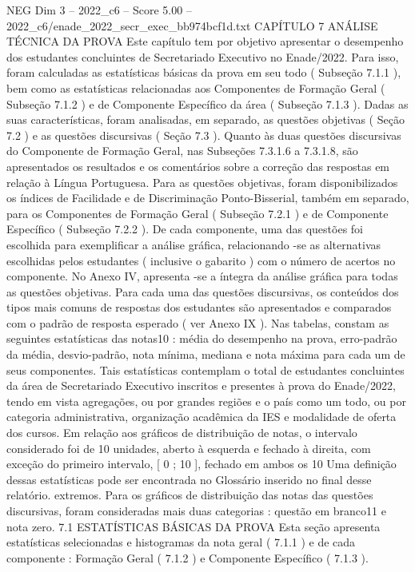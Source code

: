 \begin{textsample}{NEG Dim 3 – 2022\_c6 – Score 5.00 – 2022\_c6/enade\_2022\_secr\_exec\_bb974bcf1d.txt}  \label{ex:f3_neg_262}
CAPÍTULO 7 ANÁLISE TÉCNICA DA PROVA Este capítulo tem por objetivo apresentar o desempenho dos estudantes concluintes de Secretariado Executivo no Enade/2022.
Para isso, foram calculadas as estatísticas básicas da prova em seu todo ( Subseção 7.1.1 ), bem como as estatísticas relacionadas aos Componentes de Formação Geral ( Subseção 7.1.2 ) e de Componente Específico da área ( Subseção 7.1.3 ).
Dadas as suas características, foram analisadas, em separado, as questões objetivas ( Seção 7.2 ) e as questões discursivas ( Seção 7.3 ).
Quanto às duas questões discursivas do Componente de Formação Geral, nas Subseções 7.3.1.6 a 7.3.1.8, são apresentados os resultados e os comentários sobre a correção das respostas em relação à Língua Portuguesa.
Para as questões objetivas, foram disponibilizados os índices de Facilidade e de Discriminação Ponto-Bisserial, também em separado, para os Componentes de Formação Geral ( Subseção 7.2.1 ) e de Componente Específico ( Subseção 7.2.2 ).
De cada componente, uma das questões foi escolhida para exemplificar a análise gráfica, relacionando -se as alternativas escolhidas pelos estudantes ( inclusive o gabarito ) com o número de acertos no componente.
No Anexo IV, apresenta -se a íntegra da análise gráfica para todas as questões objetivas.
Para cada uma das questões discursivas, os conteúdos dos tipos mais comuns de respostas dos estudantes são apresentados e comparados com o padrão de resposta esperado ( ver Anexo IX ).
Nas tabelas, constam as seguintes estatísticas das notas10 : média do desempenho na prova, erro-padrão da média, desvio-padrão, nota mínima, mediana e nota máxima para cada um de seus componentes.
Tais estatísticas contemplam o total de estudantes concluintes da área de Secretariado Executivo inscritos e presentes à prova do Enade/2022, tendo em vista agregações, ou por grandes regiões e o país como um todo, ou por categoria administrativa, organização acadêmica da IES e modalidade de oferta dos cursos.
Em relação aos gráficos de distribuição de notas, o intervalo considerado foi de 10 unidades, aberto à esquerda e fechado à direita, com exceção do primeiro intervalo, [ 0 ; 10 ], fechado em ambos os 10 Uma definição dessas estatísticas pode ser encontrada no Glossário inserido no final desse relatório. extremos.
Para os gráficos de distribuição das notas das questões discursivas, foram consideradas mais duas categorias : questão em branco11 e nota zero. 7.1 ESTATÍSTICAS BÁSICAS DA PROVA Esta seção apresenta estatísticas selecionadas e histogramas da nota geral ( 7.1.1 ) e de cada componente : Formação Geral ( 7.1.2 ) e Componente Específico ( 7.1.3 ).

\end{textsample}

